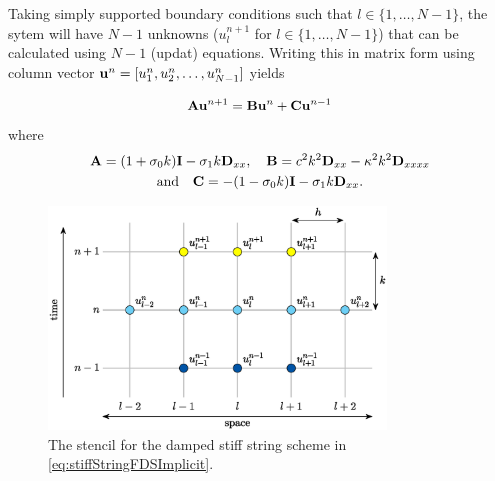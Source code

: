 {Taking simply supported boundary conditions such that $l \in \{1, \hdots, N-1\}$, the sytem will have $N-1$ unknowns ($u_l^{n+1}$ for $l \in \{1, \hdots, N-1\}$) that can be calculated using $N-1$ (updat) equations. Writing this in matrix form using column vector $\mathbf{u}^n = [u_1^n, u_2^n, \hdots, u_{N-1}^n]$ yields 

\begin{equation}\label{eq:matrixFormStiffStringImplicit}
    \mathbf{A}\mathbf{u}^{n+1} = \mathbf{B}\mathbf{u}^n + \mathbf{C} \mathbf{u}^{n-1}
\end{equation}
where 
\begin{equation*}
    \begin{gathered}
    \mathbf{A} = (1+\sigma_{0} k)\mathbf{I} - \sigma_{1} k\mathbf{D}_{xx}, \quad \mathbf{B} = c^2 k^2 \mathbf{D}_{xx} - \kappa^2 k^2 \mathbf{D}_{xxxx} \\
    \text{and} \quad \mathbf{C} = -(1-\sigma_{0} k)\mathbf{I} - \sigma_{1} k \mathbf{D}_{xx}.
    \end{gathered}
\end{equation*}
\begin{figure}[h]
    \centering
    \includegraphics[width=0.8\textwidth]{figures/resonators/stencilImplicitStiffString.eps}
    \caption{The stencil for the damped stiff string scheme in \eqref{eq:stiffStringFDSImplicit}.\label{fig:stencilStiffStringImplicit}}
\end{figure}

}
